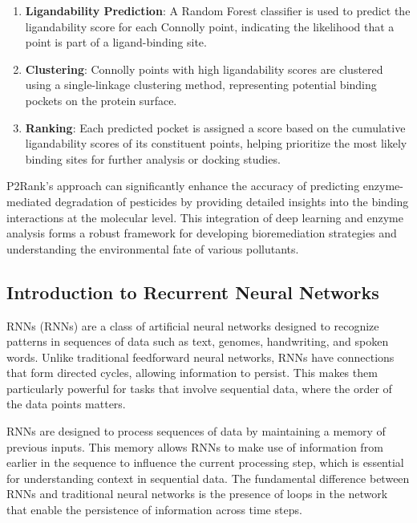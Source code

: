 \begin{enumerate}
\begin{figure}[hbt]
\begin{minipage}[t]{.9\textwidth}
            \label{fig:p2rank}
            \end{minipage}
        \end{figure}
    \item \textbf{Ligandability Prediction}: A Random Forest classifier is used to predict the ligandability score for each Connolly point, indicating the likelihood that a point is part of a ligand-binding site.
    \item \textbf{Clustering}: Connolly points with high ligandability scores are clustered using a single-linkage clustering method, representing potential binding pockets on the protein surface.
    \item \textbf{Ranking}: Each predicted pocket is assigned a score based on the cumulative ligandability scores of its constituent points, helping prioritize the most likely binding sites for further analysis or docking studies.
\end{enumerate}

P2Rank's approach can significantly enhance the accuracy of predicting enzyme-mediated degradation of pesticides by providing detailed insights into the binding interactions at the molecular level. This integration of deep learning and enzyme analysis forms a robust framework for developing bioremediation strategies and understanding the environmental fate of various pollutants. \autocite{krivakP2RankMachineLearning2018}

\subsection{Introduction to Recurrent Neural Networks}
\label{sec:Introduction to Recurrent Neural Networks}

RNNs (RNNs) are a class of artificial neural networks designed to recognize patterns in sequences of data such as text, genomes, handwriting, and spoken words. Unlike traditional feedforward neural networks, RNNs have connections that form directed cycles, allowing information to persist. This makes them particularly powerful for tasks that involve sequential data, where the order of the data points matters. \autocite{RecurrentNeuralNetwork2024}

RNNs are designed to process sequences of data by maintaining a memory of previous inputs. This memory allows RNNs to make use of information from earlier in the sequence to influence the current processing step, which is essential for understanding context in sequential data. The fundamental difference between RNNs and traditional neural networks is the presence of loops in the network that enable the persistence of information across time steps.

